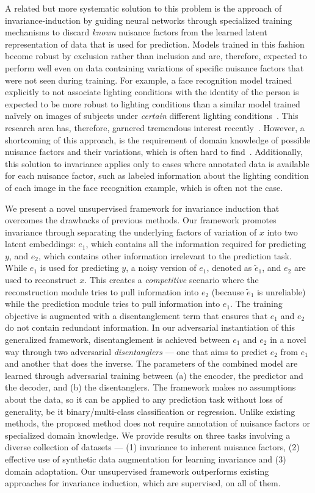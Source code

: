 A related but more systematic solution to this problem is the approach of invariance-induction by guiding neural networks through specialized training mechanisms to discard \emph{known} nuisance factors from the learned latent representation of data that is used for prediction. Models trained in this fashion become robust by exclusion rather than inclusion and are, therefore, expected to perform well even on data containing variations of specific nuisance factors that were not seen during training. For example, a face recognition model trained explicitly to not associate lighting conditions with the identity of the person is expected to be more robust to lighting conditions than a similar model trained na\"ively on images of subjects under \emph{certain} different lighting conditions~\cite{bib:sai}. This research area has, therefore, garnered tremendous interest recently~\cite{bib:dann,bib:nnmmd,bib:vfae,bib:sai}. However, a shortcoming of this approach, is the requirement of domain knowledge of possible nuisance factors and their variations, which is often hard to find~\cite{bib:drl}. Additionally, this solution to invariance applies only to cases where annotated data is available for each nuisance factor, such as labeled information about the lighting condition of each image in the face recognition example, which is often not the case.

We present a novel unsupervised framework for invariance induction that overcomes the drawbacks of previous methods. Our framework promotes invariance through separating the underlying factors of variation of $x$ into two latent embeddings: $e_1$, which contains all the information required for predicting $y$, and $e_2$, which contains other information irrelevant to the prediction task. While $e_1$ is used for predicting $y$, a noisy version of $e_1$, denoted as $\tilde{e}_1$, and $e_2$ are used to reconstruct $x$. This creates a \textit{competitive} scenario where the reconstruction module tries to pull information into $e_2$ (because $\tilde{e}_1$ is unreliable) while the prediction module tries to pull information into $e_1$. The training objective is augmented with a disentanglement term that ensures that $e_1$ and $e_2$ do not contain redundant information. In our adversarial instantiation of this generalized framework, disentanglement is achieved between $e_1$ and $e_2$ in a novel way through two adversarial \textit{disentanglers} --- one that aims to predict $e_2$ from $e_1$ and another that does the inverse. The parameters of the combined model are learned through adversarial training between (a) the encoder, the predictor and the decoder, and (b) the disentanglers. The framework makes no assumptions about the data, so it can be applied to any prediction task without loss of generality, be it binary/multi-class classification or regression. Unlike existing methods, the proposed method does not require annotation of nuisance factors or specialized domain knowledge. We provide results on three tasks involving a diverse collection of datasets --- (1) invariance to inherent nuisance factors, (2) effective use of synthetic data augmentation for learning invariance and (3) domain adaptation. Our unsupervised framework outperforms existing approaches for invariance induction, which are supervised, on all of them.